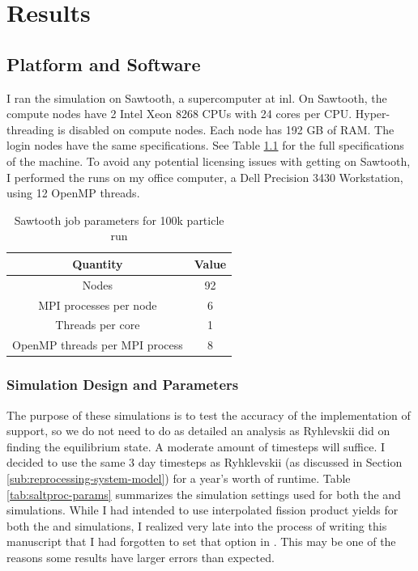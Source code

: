 \chapter{Results}
\label{ch:chapter5}
\glsresetall

\section{Platform and Software}
\label{sub:platform-software}
I ran the \OpenMC simulation on Sawtooth, a supercomputer at
\Gls{inl}. On Sawtooth, the compute nodes have 2 Intel Xeon 8268 CPUs with 24 cores per
CPU. Hyper-threading is disabled on compute nodes. Each node has 192 GB of RAM.
The login nodes have the same specifications. See Table \ref{tab:sawtooth-params}
for the full specifications of the machine. To avoid any potential licensing
issues with getting \SerpentTWO on Sawtooth, I performed the \SerpentTWO runs
on my office computer, a Dell Precision 3430 Workstation, using 12 OpenMP threads.

\begin{table}[htpb] 
    \centering 
    \caption{Sawtooth job parameters for 100k particle \OpenMC run}
    \label{tab:sawtooth-params}
    \begin{tabular}{|c|c|} 
        \hline
        Quantity & Value\\
        \hline
        Nodes & 92 \\
        \hline
        MPI processes per node & 6 \\
        \hline
        Threads per core & 1 \\
        \hline
        OpenMP threads per MPI process & 8 \\
        \hline
    \end{tabular}
\end{table}

\subsection{Simulation Design and Parameters}
\label{sub:simulation-parameters}

The purpose of these simulations is to test the accuracy of
the implementation of \OpenMC support, so we do not need to do as detailed an
analysis as Ryhlevskii did on finding the equilibrium state. A moderate amount
of timesteps will suffice. I decided to use the same 3 day timesteps as Ryhklevskii
\cite{rykhlevskii_modeling_2019} (as discussed in Section \ref{sub:reprocessing-system-model})
for a year's worth of runtime. Table \ref{tab:saltproc-params} summarizes the simulation
settings used for both the \SerpentTWO and \OpenMC simulations. While I had intended
to use interpolated fission product yields for both the \OpenMC and \SerpentTWO simulations,
I realized very late into the process of writing this manuscript that I had forgotten to set
that option in \OpenMC. This may be one of the reasons some results have larger errors than expected.
 
